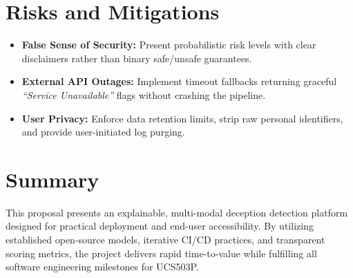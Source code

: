 \documentclass[11pt,a4paper]{article}
\begin{document}
\section{Risks and Mitigations}
\begin{itemize}[leftmargin=0.7cm]
    \item \textbf{False Sense of Security:} Present probabilistic risk levels with clear disclaimers rather than binary safe/unsafe guarantees.
    \item \textbf{External API Outages:} Implement timeout fallbacks returning graceful \emph{``Service Unavailable''} flags without crashing the pipeline.
    \item \textbf{User Privacy:} Enforce data retention limits, strip raw personal identifiers, and provide user-initiated log purging.
\end{itemize}

\section{Summary}
This proposal presents an explainable, multi-modal deception detection platform designed for practical deployment and end-user accessibility. By utilizing established open-source models, iterative CI/CD practices, and transparent scoring metrics, the project delivers rapid time-to-value while fulfilling all software engineering milestones for UCS503P.
\end{document}
